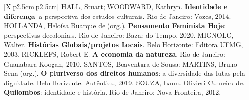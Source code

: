 \begin{xltabular}{\linewidth}{|X|p{2.5cm}|p{2.5cm}|}
{HALL, Stuart; WOODWARD, Kathryn. \textbf{Identidade e diferença}: a perspectiva dos estudos culturais. Rio de Janeiro: Vozes, 2014. \newline
{} \newline
HOLLANDA, Heloísa Buarque de (org.). \textbf{Pensamento Feminista Hoje}: perspectivas decoloniais. Rio de Janeiro: Bazar do Tempo, 2020. \newline
MIGNOLO, Walter. \textbf{Histórias Globais/projetos Locais}. Belo Horizonte: Editora UFMG, 2003. \newline
RICKLEFS, Robert E. \textbf{A economia da natureza}. Rio de Janeiro: Guanabara Koogan, 2010. \newline
SANTOS, Boaventura de Sousa; MARTINS, Bruno Sena (org.). \textbf{O pluriverso dos direitos humanos}: a diversidade das lutas pela dignidade. Belo Horizonte: Autêntica, 2019. \newline
SOUZA, Laura Olivieri Carneiro de. \textbf{Quilombos}: identidade e história. Rio de Janeiro: Nova Fronteira, 2012. \newline
{}
} \\ \hline
\end{xltabular}

